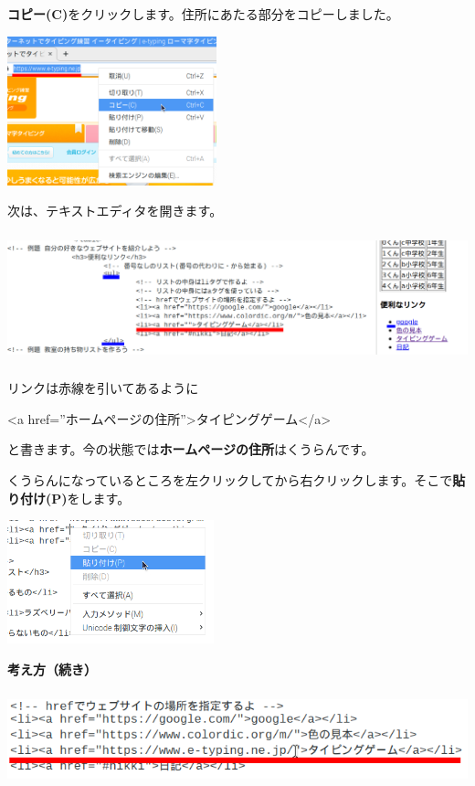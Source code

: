 \documentclass[a4paper,12pt]{jarticle}
\begin{document}
\textbf{コピー(C)}をクリックします。住所にあたる部分をコピーしました。

\centering
\includegraphics[width=6.064cm,height=4.311cm]{textbook-img197.png}

\bigskip
\flushleft

次は、テキストエディタを開きます。

\centering
\includegraphics[width=15.157cm,height=3.755cm]{textbook-img198.png}

\bigskip
\flushleft

リンクは赤線を引いてあるように

{\textless}a
href=”ホームページの住所”{\textgreater}タイピングゲーム{\textless}/a{\textgreater}

と書きます。今の状態では\textbf{ホームページの住所}はくうらんです。

くうらんになっているところを左クリックしてから右クリックします。そこで\textbf{貼り付け(P)}をします。





\centering
\includegraphics[width=5.992cm,height=3.577cm]{textbook-img199.png}

\clearpage
\flushleft
\textbf{考え方（続き）}


\bigskip

\centering
\includegraphics[width=15.953cm,height=2.746cm]{textbook-img200.png}
\end{document}

